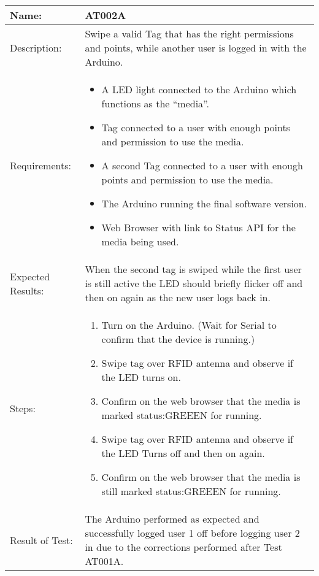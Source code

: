 \begin{table}[h]
	\centering
		\begin{tabular}{|l|p{9cm}|}
		\hline
		\hline
		Name: & AT002A\\
		\hline
		Description: & Swipe a valid Tag that has the right permissions and points, while another user is logged in with the Arduino.\\
		\hline
		Requirements: & 
		\begin{itemize}
		  \item A LED light connected to the Arduino which functions as the ``media''.
			\item Tag connected to a user with enough points and permission to use the media.
			\item A second Tag connected to a user with enough points and permission to use the media.
			\item The Arduino running the final software version.
			\item Web Browser with link to Status API for the media being used.
		\end{itemize}
		\\
		\hline
		Expected Results: & When the second tag is swiped while the first user is still active the LED should briefly flicker off and then on again as the new user logs back in.\\
		\hline
		Steps: & 
		\begin{enumerate}
			\item Turn on the Arduino. (Wait for Serial to confirm that the device is running.)
			\item Swipe tag over RFID antenna and observe if the LED turns on.
			\item Confirm on the web browser that the media is marked status:GREEEN for running.
			\item Swipe tag over RFID antenna and observe if the LED Turns off and then on again.
			\item Confirm on the web browser that the media is still marked status:GREEEN for running.
		\end{enumerate}
		\\
		\hline
		Result of Test: & The Arduino performed as expected and successfully logged user 1 off before logging user 2 in due to the corrections performed after Test AT001A.\\
		\hline
		\end{tabular}
\end{table}
